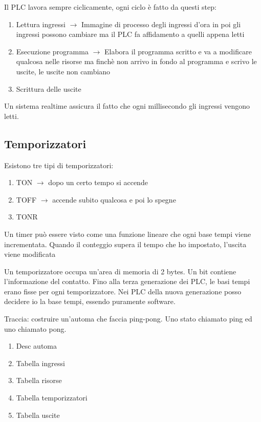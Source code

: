\documentclass{article}
\begin{document}
    Il PLC lavora sempre ciclicamente, ogni ciclo è fatto da questi step:

    \begin{enumerate}
        \item Lettura ingressi $\rightarrow$ Immagine di processo degli ingressi d'ora in poi gli ingressi possono cambiare ma il PLC fa affidamento a quelli appena letti
        \item Esecuzione programma $\rightarrow$ Elabora il programma scritto e va a modificare qualcosa nelle risorse ma finchè non arrivo in fondo al programma e scrivo le uscite, le uscite non cambiano
        \item Scrittura delle uscite
    \end{enumerate}

    Un sistema realtime assicura il fatto che ogni millisecondo gli ingressi vengono letti.

    \subsection{Temporizzatori}

    Esistono tre tipi di temporizzatori:

    \begin{enumerate}
        \item TON $\rightarrow$ dopo un certo tempo si accende
        \item TOFF $\rightarrow$ accende subito qualcosa e poi lo spegne
        \item TONR
    \end{enumerate}

    Un timer può essere visto come una funzione lineare che ogni base tempi viene incrementata. Quando il conteggio supera il tempo che ho impostato, l'uscita viene modificata
    \newpage
    
    Un temporizzatore occupa un'area di memoria di 2 bytes. Un bit contiene l'informazione del contatto. \newline
    Fino alla terza generazione dei PLC, le basi tempi erano fisse per ogni temporizzatore. Nei PLC della nuova generazione posso decidere io la base tempi, essendo puramente software.

    Traccia: costruire un'automa che faccia ping-pong. Uno stato chiamato ping ed uno chiamato pong.

    \begin{enumerate}
        \item Desc automa
        \item Tabella ingressi
        \item Tabella risorse
        \item Tabella temporizzatori
        \item Tabella uscite
    \end{enumerate}
\end{document}
